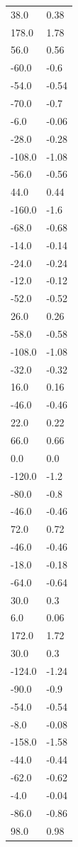 \begin{longtable}{ll}
38.0 & 0.38 \\
178.0 & 1.78 \\
56.0 & 0.56 \\
-60.0 & -0.6 \\
-54.0 & -0.54 \\
-70.0 & -0.7 \\
-6.0 & -0.06 \\
-28.0 & -0.28 \\
-108.0 & -1.08 \\
-56.0 & -0.56 \\
44.0 & 0.44 \\
-160.0 & -1.6 \\
-68.0 & -0.68 \\
-14.0 & -0.14 \\
-24.0 & -0.24 \\
-12.0 & -0.12 \\
-52.0 & -0.52 \\
26.0 & 0.26 \\
-58.0 & -0.58 \\
-108.0 & -1.08 \\
-32.0 & -0.32 \\
16.0 & 0.16 \\
-46.0 & -0.46 \\
22.0 & 0.22 \\
66.0 & 0.66 \\
0.0 & 0.0 \\
-120.0 & -1.2 \\
-80.0 & -0.8 \\
-46.0 & -0.46 \\
72.0 & 0.72 \\
-46.0 & -0.46 \\
-18.0 & -0.18 \\
-64.0 & -0.64 \\
30.0 & 0.3 \\
6.0 & 0.06 \\
172.0 & 1.72 \\
30.0 & 0.3 \\
-124.0 & -1.24 \\
-90.0 & -0.9 \\
-54.0 & -0.54 \\
-8.0 & -0.08 \\
-158.0 & -1.58 \\
-44.0 & -0.44 \\
-62.0 & -0.62 \\
-4.0 & -0.04 \\
-86.0 & -0.86 \\
98.0 & 0.98 \\

\end{longtable}

